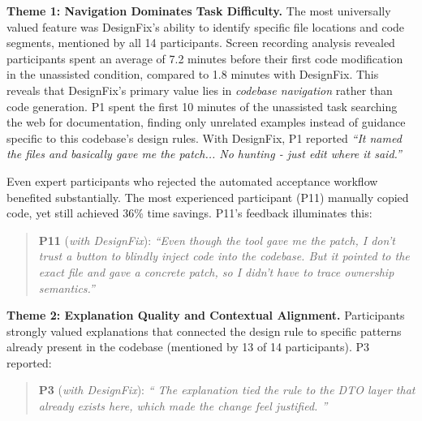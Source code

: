 \documentclass[conference]{IEEEtran}
\newcommand{\pquote}[3]{%
\vspace{2pt}
\begin{quote}\small
\textbf{#1} (\emph{#2}): \emph{``#3''}
\end{quote}
\vspace{2pt}
}
\begin{document}
\textbf{Theme 1: Navigation Dominates Task Difficulty.} The most universally valued feature was DesignFix's ability to identify specific file locations and code segments, mentioned by all 14 participants. Screen recording analysis revealed participants spent an average of 7.2 minutes before their first code modification in the unassisted condition, compared to 1.8 minutes with DesignFix.
This reveals that DesignFix's primary value lies in \textit{codebase navigation} rather than code generation. P1 spent the first 10 minutes of the unassisted task searching the web for documentation, finding only unrelated examples instead of guidance specific to this codebase's design rules.
With DesignFix, P1 reported 
\textit{``It named the files and basically gave me the patch... No hunting - just edit where it said.''} 


Even expert participants who rejected the automated acceptance workflow benefited substantially. The most experienced participant (P11) manually copied code, yet still achieved 36\% time savings. P11's feedback illuminates this:
\pquote{P11}{with DesignFix}{Even though the tool gave me the patch, I don't trust a button to blindly inject code into the codebase. But it pointed to the exact file and gave a concrete patch, so I didn't have to trace ownership semantics.}










\textbf{Theme 2: Explanation Quality and Contextual Alignment.} Participants strongly valued explanations that connected the design rule to specific patterns already present in the codebase (mentioned by 13 of 14 participants). P3 reported: 
\pquote{P3}{with DesignFix}{
The explanation tied the rule to the DTO layer that already exists here, which made the change feel justified.
}
\end{document}

